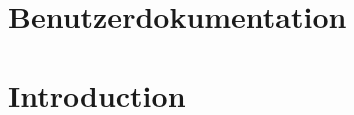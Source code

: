 \documentclass{article}
\begin{document}
\newpage
\nocite{}





\appendix

\section{Benutzerdokumentation}
\label{app1}
\section{Introduction}







\end{document}
